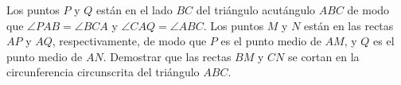 Los puntos $P$ y $Q$ están en el lado $BC$ del triángulo acutángulo $ABC$ de modo que $\angle PAB = \angle BCA$ y $\angle CAQ = \angle ABC$. Los puntos $M$ y $N$ están en las rectas $AP$ y $AQ$, respectivamente, de modo que $P$ es el punto medio de $AM$, y $Q$ es el punto medio de $AN$. Demostrar que las rectas $BM$ y $CN$ se cortan en la circunferencia circunscrita del triángulo $ABC$.